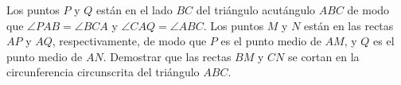 Los puntos $P$ y $Q$ están en el lado $BC$ del triángulo acutángulo $ABC$ de modo que $\angle PAB = \angle BCA$ y $\angle CAQ = \angle ABC$. Los puntos $M$ y $N$ están en las rectas $AP$ y $AQ$, respectivamente, de modo que $P$ es el punto medio de $AM$, y $Q$ es el punto medio de $AN$. Demostrar que las rectas $BM$ y $CN$ se cortan en la circunferencia circunscrita del triángulo $ABC$.